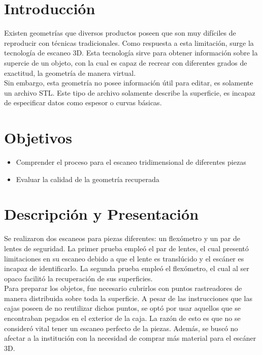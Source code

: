 \section{Introducci\'on}
Existen geometr\'ias que diversos productos poseen que son muy dif\'iciles de reproducir con
t\'ecnicas tradicionales. Como respuesta a esta limitaci\'on, surge la tecnolog\'ia de escaneo 3D.
Esta tecnolog\'ia sirve para obtener informaci\'on sobre la supercie de un objeto, con la cual es capaz de recrear
con diferentes grados de exactitud, la geometr\'ia de manera virtual.\\

Sin embargo, esta geometr\'ia no posee informaci\'on \'util para editar, es solamente un archivo STL.
Este tipo de archivo solamente describe la superficie, es incapaz de especificar datos como espesor o
curvas b\'asicas.

\section{Objetivos}
\begin{itemize}
 \item Comprender el proceso para el escaneo tridimensional de diferentes piezas
 \item Evaluar la calidad de la geometr\'ia recuperada
\end{itemize}

\section{Descripci\'on y Presentaci\'on}
Se realizaron dos escaneos para piezas diferentes: un flex\'ometro y un par de lentes de seguridad.
La primer prueba emple\'o el par de lentes, el cual present\'o limitaciones en su escaneo debido a que
el lente es transl\'ucido y el esc\'aner es incapaz de identificarlo. La segunda prueba emple\'o el flex\'ometro,
el cual al ser opaco facilit\'o la recuperaci\'on de sus superficies.\\

Para preparar los objetos, fue necesario cubrirlos con puntos rastreadores de manera distribuida sobre toda la superficie.
A pesar de las instrucciones que las cajas poseen de no reutilizar dichos puntos, se opt\'o por usar aquellos que se encontraban
pegados en el exterior de la caja. La raz\'on de esto es que no se consider\'o vital tener un escaneo perfecto de la piezas.
Adem\'as, se busc\'o no afectar a la instituci\'on con la necesidad de comprar m\'as material para el esc\'aner 3D.